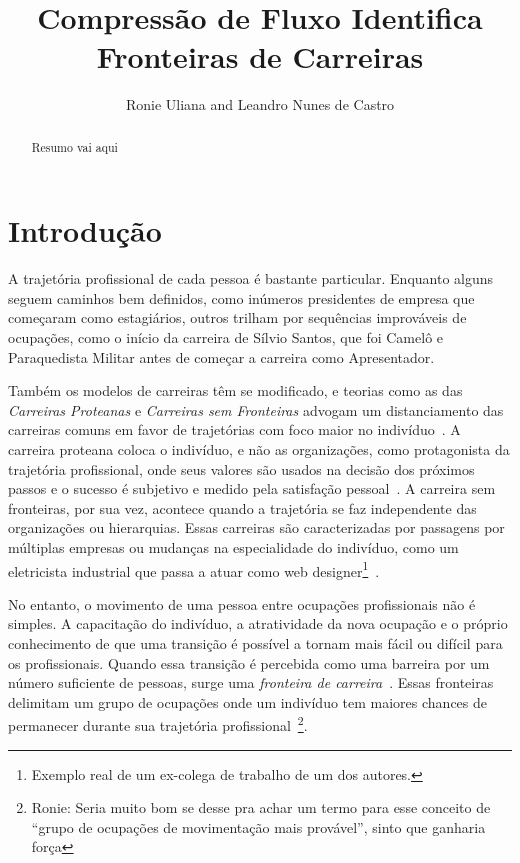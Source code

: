 \documentclass[
  article,
  11pt,
  a4paper,
  english,
  brazil,
  sumario=tradicional]{abntex2}
\title{Compressão de Fluxo Identifica Fronteiras de Carreiras}
\author{Ronie Uliana and Leandro Nunes de Castro}
\begin{document}

\frenchspacing

\maketitle

\begin{abstract}
Resumo vai aqui
\end{abstract}

\section{Introdução}

A trajetória profissional de cada pessoa é bastante particular. Enquanto alguns seguem caminhos bem definidos, como inúmeros presidentes de empresa que começaram como estagiários, outros trilham por sequências improváveis de ocupações, como o início da carreira de Sílvio Santos, que foi Camelô e Paraquedista Militar antes de começar a carreira como Apresentador.


Também os modelos de carreiras têm se modificado, e teorias como as das \textit{Carreiras Proteanas} e \textit{Carreiras sem Fronteiras} advogam um distanciamento das carreiras comuns em favor de trajetórias com foco maior no indivíduo~\cite{Bendassolli2009-bg}. A carreira proteana coloca o indivíduo, e não as organizações, como protagonista da trajetória profissional, onde seus valores são usados na decisão dos próximos passos e o sucesso é subjetivo e medido pela satisfação pessoal~\cite{Hall2004-ke}. A carreira sem fronteiras, por sua vez, acontece quando a trajetória se faz independente das organizações ou hierarquias. Essas carreiras são caracterizadas por passagens por múltiplas empresas ou mudanças na especialidade do indivíduo, como um eletricista industrial que passa a atuar como web designer\footnote{Exemplo real de um ex-colega de trabalho de um dos autores.}~\cite{Arthur1994-qq}.


No entanto, o movimento de uma pessoa entre ocupações profissionais não é simples. A capacitação do indivíduo, a atratividade da nova ocupação e o próprio conhecimento de que uma transição é possível a tornam mais fácil ou difícil para os profissionais. Quando essa transição é percebida como uma barreira por um número suficiente de pessoas, surge uma \textit{fronteira de carreira}~\cite{Gunz2007-hr}. Essas fronteiras delimitam um grupo de ocupações onde um indivíduo tem maiores chances de permanecer durante sua trajetória profissional~\footnote{Ronie: Seria muito bom se desse pra achar um termo para esse conceito de \enquote{grupo de ocupações de movimentação mais provável}, sinto que  ganharia força}.
\end{document}
